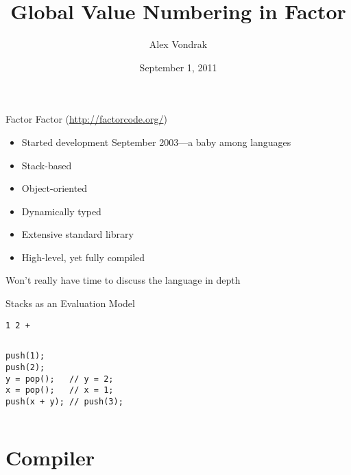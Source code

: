 \documentclass{beamer}
\title{Global Value Numbering in Factor}
\author{Alex Vondrak}
\institute{\texttt{ajvondrak@csupomona.edu}}
\date{September 1, 2011}
\begin{document}
\maketitle

\begin{frame}{Factor}
  Factor (\url{http://factorcode.org/})
  \begin{itemize}
    \item Started development September 2003---a baby among languages
    \item \alert{Stack-based}
    \item Object-oriented
    \item Dynamically typed
    \item Extensive standard library
    \item High-level, yet fully \alert{compiled}
  \end{itemize}

  Won't really have time to discuss the language in depth
\end{frame}

\begin{frame}[fragile]{Stacks as an Evaluation Model}
  \begin{example}[Code]
    \begin{verbatim}
1 2 +
    \end{verbatim}
  \end{example}

  \begin{example}[Execution]
    \begin{columns}[c,onlytextwidth]
      \begin{column}[c]{.5\textwidth}
        \begin{verbatim}
push(1);
push(2);
y = pop();   // y = 2;
x = pop();   // x = 1;
push(x + y); // push(3);
        \end{verbatim}
      \end{column}

      \begin{column}[c]{.5\textwidth}
      \end{column}
    \end{columns}
  \end{example}
\end{frame}

\section{Compiler}
\end{document}

